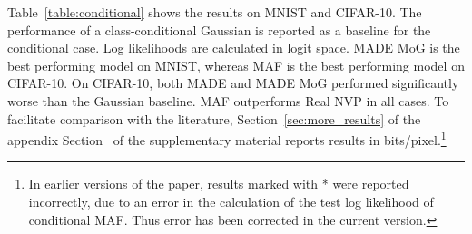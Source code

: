 Table~\ref{table:conditional} shows the results on MNIST and CIFAR-10. The performance of a class-conditional Gaussian is reported as a baseline for the conditional case. Log likelihoods are calculated in logit space. MADE MoG is the best performing model on MNIST, whereas MAF is the best performing model on CIFAR-10. On CIFAR-10, both MADE and MADE MoG performed significantly worse than the Gaussian baseline. MAF outperforms Real NVP in all cases.
To facilitate comparison with the literature,
\ifarxiv
Section~\ref{sec:more_results} of the appendix
\else
Section~ of the supplementary material
\fi
reports results in bits/pixel.\footnote{In earlier versions of the paper, results marked with * were reported incorrectly, due to an error in the calculation of the test log likelihood of conditional MAF\@. Thus error has been corrected in the current version.}

